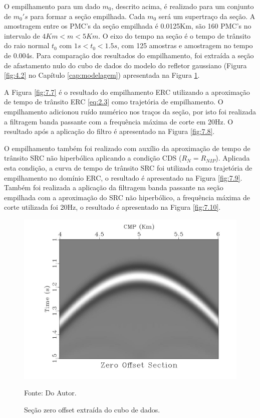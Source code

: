 
O empilhamento para um dado $m_0$, descrito acima, é realizado para um conjunto de $m_0's$ para formar a seção empilhada.
Cada $m_0$ será um supertraço da seção.
A amostragem entre os PMC's da seção empilhada é 0.0125Km, são 160 PMC's no intervalo de $4Km<m<5Km$. O eixo do tempo na 
seção é o tempo de trânsito do raio normal $t_0$ com $1s<t_0<1.5s$, com 125 amostras e amostragem no tempo de 0.004s.
Para comparação dos resultados do empilhamento, foi extraída a seção de afastamento nulo do cubo de dados do modelo do
refletor gaussiano (Figura \ref{fig:4.2} no Capítulo \ref{cap:modelagem}) apresentada na Figura \ref{fig:7.6}.

A Figura \ref{fig:7.7} é o resultado do empilhamento ERC utilizando a aproximação de tempo de trânsito ERC \ref{eq:2.3}
como trajetória de empilhamento. O empilhamento adicionou ruído numérico nos traços da seção, por isto foi realizada a filtragem
banda passante com a frequência máxima de corte em 20Hz. O resultado após a aplicação do filtro é apresentado na Figura
\ref{fig:7.8}.

O empilhamento também foi realizado com auxílio da aproximação de tempo de trânsito SRC não hiperbólica aplicando a condição CDS
($R_N=R_{NIP}$). Aplicada esta condição, a curva de tempo de trânsito SRC foi utilizada como trajetória de empilhamento no domínio
ERC, o resultado é apresentado na Figura \ref{fig:7.9}. Também foi realizada a aplicação da filtragem banda passante na seção
empilhada com a aproximação do SRC não hiperbólico, a frequência máxima de corte utilizada foi 20Hz, o resultado é apresentado
na Figura \ref{fig:7.10}.

\begin{figure}
\caption{Seção zero offset extraída do cubo de dados.}
\begin{center}
\includegraphics[scale=0.4]{images/zeroOffsetSection.jpeg}
\vspace{-0.3cm}
\end{center}
\begin{center}
 Fonte: Do Autor.
\end{center}
\label{fig:7.6}
\end{figure}

